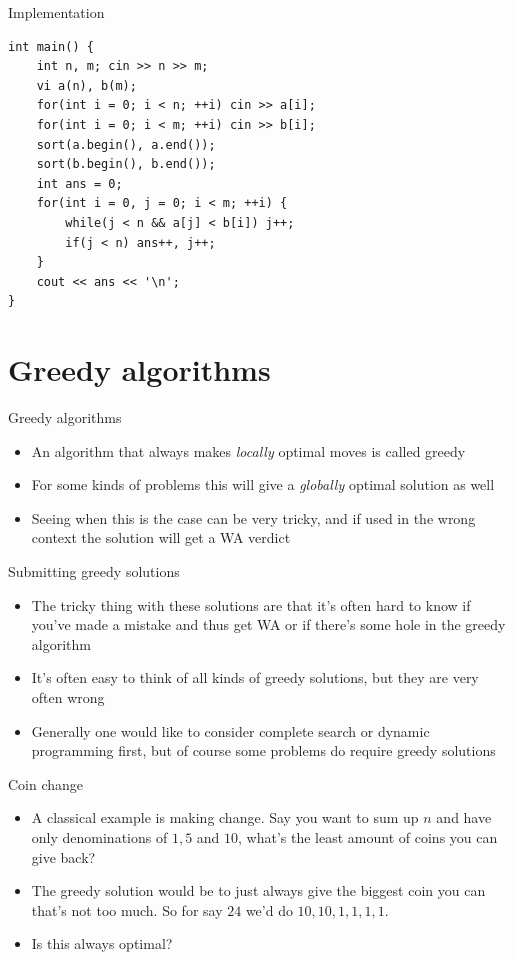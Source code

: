 \documentclass{beamer}
\begin{document}
\begin{frame}{Implementation}
\begin{verbatim}
int main() {
    int n, m; cin >> n >> m;
    vi a(n), b(m);
    for(int i = 0; i < n; ++i) cin >> a[i];
    for(int i = 0; i < m; ++i) cin >> b[i];
    sort(a.begin(), a.end());
    sort(b.begin(), b.end());
    int ans = 0;
    for(int i = 0, j = 0; i < m; ++i) {
        while(j < n && a[j] < b[i]) j++;
        if(j < n) ans++, j++;
    }
    cout << ans << '\n';
}
\end{verbatim}
\end{frame}

\section*{Greedy algorithms}

\begin{frame}[plain]{Greedy algorithms}
    \begin{itemize}
        \item An algorithm that always makes \textit{locally} optimal moves is called greedy
        \item For some kinds of problems this will give a \textit{globally} optimal solution as well
        \item Seeing when this is the case can be very tricky, and if used in the wrong context the solution will get a WA verdict
    \end{itemize}
\end{frame}

\begin{frame}[plain]{Submitting greedy solutions}
    \begin{itemize}
        \item The tricky thing with these solutions are that it's often hard to know if you've made a mistake and thus get WA or if there's some hole in the greedy algorithm
        \item It's often easy to think of all kinds of greedy solutions, but they are very often wrong
        \item Generally one would like to consider complete search or dynamic programming first, but of course some problems do require greedy solutions
    \end{itemize}
\end{frame}

\begin{frame}[plain]{Coin change}
    \begin{itemize}
        \item A classical example is making change. Say you want to sum up $n$ and have only denominations of $1, 5$ and $10$, what's the least amount of coins you can give back?
        \item The greedy solution would be to just always give the biggest coin you can that's not too much. So for say $24$ we'd do $10, 10, 1, 1, 1, 1$.
        \item Is this always optimal?
    \end{itemize}
\end{frame}
\end{document}

